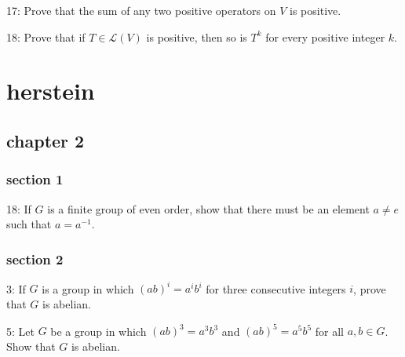 \documentclass{article}
\begin{document}
17: Prove that the sum of any two positive operators on $V$ is positive.

18: Prove that if $T \in \mathcal{L}(V)$ is positive, then so is $T^{k}$ for every positive integer $k$.

\section{herstein}
\subsection*{chapter 2}
\subsubsection*{section 1}
18: If $G$ is a finite group of even order, show that there must be an element $a \neq e$ such that $a=a^{-1}$.
\subsubsection*{section 2}
3: If $G$ is a group in which $(a b)^{i}=a^{i} b^{i}$ for three consecutive integers $i$, prove that $G$ is abelian.

5: Let $G$ be a group in which $(a b)^{3}=a^{3} b^{3}$ and $(a b)^{5}=a^{5} b^{5}$ for all $a, b \in G$. Show that $G$ is abelian.
\end{document}

